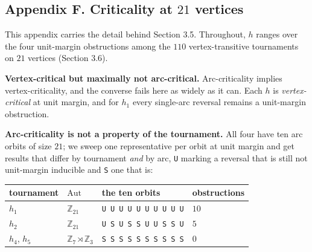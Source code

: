 \documentclass[
]{article}
\newcounter{none} %
\begin{document}
\subsection{\texorpdfstring{Appendix F. Criticality at \(21\)
vertices}{Appendix F. Criticality at 21 vertices}}\label{appendix-f.-criticality-at-21-vertices}

This appendix carries the detail behind Section 3.5. Throughout, \(h\)
ranges over the four unit-margin obstructions among the \(110\)
vertex-transitive tournaments on \(21\) vertices (Section 3.6).

\textbf{Vertex-critical but maximally not arc-critical.} Arc-criticality
implies vertex-criticality, and the converse fails here as widely as it
can. Each \(h\) is \emph{vertex-critical} at unit margin, and for
\(h_1\) every single-arc reversal remains a unit-margin obstruction.

\textbf{Arc-criticality is not a property of the tournament.} All four
have ten arc orbits of size \(21\); we sweep one representative per
orbit at unit margin and get results that differ by tournament
\emph{and} by arc, \texttt{U} marking a reversal that is still not
unit-margin inducible and \texttt{S} one that is:

{\def\LTcaptype{none} %
\begin{longtable}[]{@{}
  >{\raggedright\arraybackslash}p{}
  >{\raggedright\arraybackslash}p{}
  >{\raggedright\arraybackslash}p{}
  >{\raggedright\arraybackslash}p{}@{}}
\toprule\noalign{}
\begin{minipage}[b]{\linewidth}\raggedright
tournament
\end{minipage} & \begin{minipage}[b]{\linewidth}\raggedright
\(\mathrm{Aut}\)
\end{minipage} & \begin{minipage}[b]{\linewidth}\raggedright
the ten orbits
\end{minipage} & \begin{minipage}[b]{\linewidth}\raggedright
obstructions
\end{minipage} \\
\midrule\noalign{}
\endhead
\bottomrule\noalign{}
\endlastfoot
\(h_1\) & \(\mathbb{Z}_{21}\) & \texttt{U\ U\ U\ U\ U\ U\ U\ U\ U\ U} &
\(10\) \\
\(h_2\) & \(\mathbb{Z}_{21}\) & \texttt{U\ S\ U\ S\ S\ U\ U\ S\ S\ U} &
\(5\) \\
\(h_4\), \(h_5\) & \(\mathbb{Z}_7 \rtimes \mathbb{Z}_3\) &
\texttt{S\ S\ S\ S\ S\ S\ S\ S\ S\ S} & \(0\) \\
\end{longtable}
}
\end{document}
